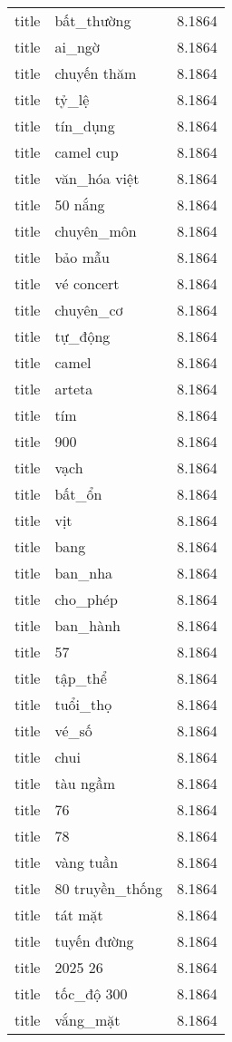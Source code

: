 \documentclass{article}
\begin{document}
\begin{tabular}{lll}
title & bất\_thường & 8.1864\\
title & ai\_ngờ & 8.1864\\
title & chuyến thăm & 8.1864\\
title & tỷ\_lệ & 8.1864\\
title & tín\_dụng & 8.1864\\
title & camel cup & 8.1864\\
title & văn\_hóa việt & 8.1864\\
title & 50 nắng & 8.1864\\
title & chuyên\_môn & 8.1864\\
title & bảo mẫu & 8.1864\\
title & vé concert & 8.1864\\
title & chuyên\_cơ & 8.1864\\
title & tự\_động & 8.1864\\
title & camel & 8.1864\\
title & arteta & 8.1864\\
title & tím & 8.1864\\
title & 900 & 8.1864\\
title & vạch & 8.1864\\
title & bất\_ổn & 8.1864\\
title & vịt & 8.1864\\
title & bang & 8.1864\\
title & ban\_nha & 8.1864\\
title & cho\_phép & 8.1864\\
title & ban\_hành & 8.1864\\
title & 57 & 8.1864\\
title & tập\_thể & 8.1864\\
title & tuổi\_thọ & 8.1864\\
title & vé\_số & 8.1864\\
title & chui & 8.1864\\
title & tàu ngầm & 8.1864\\
title & 76 & 8.1864\\
title & 78 & 8.1864\\
title & vàng tuần & 8.1864\\
title & 80 truyền\_thống & 8.1864\\
title & tát mặt & 8.1864\\
title & tuyến đường & 8.1864\\
title & 2025 26 & 8.1864\\
title & tốc\_độ 300 & 8.1864\\
title & vắng\_mặt & 8.1864\\

\end{tabular}
\end{document}
